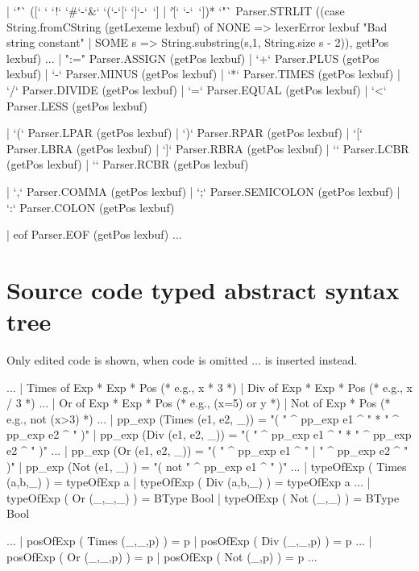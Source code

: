 \documentclass[10pt]{article}
\begin{document}
\begin{fancycode}[frame=lines,fontsize=\scriptsize,label=\textit{edited code - SRC/Lexer.lex - }]
  | `"` ([` ` `!` `#`-`&` `(`-`[` `]`-`~`] | `\`[` `-`~`])* `"`
                        { Parser.STRLIT
                            ((case String.fromCString (getLexeme lexbuf) of
                               NONE => lexerError lexbuf "Bad string constant"
                             | SOME s => String.substring(s,1,
                                                          String.size s - 2)),
                             getPos lexbuf) }
...
  | ":="                { Parser.ASSIGN    (getPos lexbuf) }
  | `+`                 { Parser.PLUS      (getPos lexbuf) }
  | `-`                 { Parser.MINUS     (getPos lexbuf) }
  | `*`                 { Parser.TIMES     (getPos lexbuf) }
  | `/`                 { Parser.DIVIDE    (getPos lexbuf) }
  | `=`                 { Parser.EQUAL     (getPos lexbuf) }
  | `<`                 { Parser.LESS      (getPos lexbuf) }

  | `(`                 { Parser.LPAR      (getPos lexbuf) }
  | `)`                 { Parser.RPAR      (getPos lexbuf) }
  | `[`                 { Parser.LBRA      (getPos lexbuf) }
  | `]`                 { Parser.RBRA      (getPos lexbuf) }
  | `{`                 { Parser.LCBR      (getPos lexbuf) }
  | `}`                 { Parser.RCBR      (getPos lexbuf) }

  | `,`                 { Parser.COMMA     (getPos lexbuf) }
  | `;`                 { Parser.SEMICOLON (getPos lexbuf) }
  | `:`                 { Parser.COLON     (getPos lexbuf) }

  | eof                 { Parser.EOF       (getPos lexbuf) }
...
\end{fancycode}

\section{Source code typed abstract syntax tree}
Only edited code is shown, when code is omitted $\ldots$ is inserted instead.
\begin{fancycode}[frame=lines,fontsize=\scriptsize,label=\textit{edited code - SRC/TpAbSyn.sml - }]
...
    | Times   of Exp * Exp         * Pos      (* e.g., x * 3 *)
    | Div     of Exp * Exp         * Pos      (* e.g., x / 3 *)
...
    | Or      of Exp * Exp         * Pos      (* e.g., (x=5) or y *)
    | Not     of Exp               * Pos      (* e.g., not (x>3) *)
...
    | pp_exp (Times (e1, e2, _))    = "( " ^ pp_exp e1 ^ " * " ^ pp_exp e2 ^ " )"
    | pp_exp (Div   (e1, e2, _))    = "( " ^ pp_exp e1 ^ " * " ^ pp_exp e2 ^ " )"
...
    | pp_exp (Or    (e1, e2, _))    = "( " ^ pp_exp e1 ^ " | " ^ pp_exp e2 ^ " )"
    | pp_exp (Not   (e1, _)    )    = "( not " ^ pp_exp e1 ^ " )"
...
    | typeOfExp ( Times  (a,b,_) ) = typeOfExp a
    | typeOfExp ( Div    (a,b,_) ) = typeOfExp a
...
    | typeOfExp ( Or     (_,_,_) ) = BType Bool
    | typeOfExp ( Not    (_,_)   ) = BType Bool

...
    | posOfExp  ( Times  (_,_,p) ) = p
    | posOfExp  ( Div    (_,_,p) ) = p
...
    | posOfExp  ( Or     (_,_,p) ) = p
    | posOfExp  ( Not    (_,p)   ) = p
...
\end{fancycode}
\end{document}
